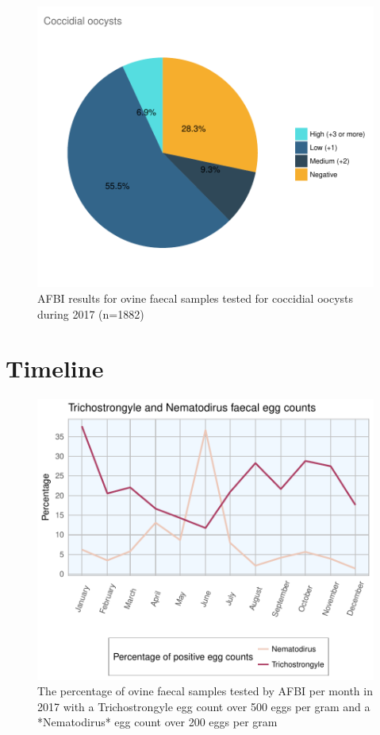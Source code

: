 \documentclass[]{book}
\begin{document}
\begin{figure}

{\centering \includegraphics{AFBI_files/figure-latex/unnamed-chunk-121-1} 

}

\caption{AFBI results for ovine faecal samples tested for coccidial oocysts during 2017 (n=1882)}\label{fig:unnamed-chunk-121}
\end{figure}

\section{Timeline}\label{timeline}

\begin{figure}

{\centering \includegraphics{AFBI_files/figure-latex/unnamed-chunk-127-1} 

}

\caption{The percentage  of ovine faecal samples tested by AFBI per month in 2017 with a Trichostrongyle egg count over 500 eggs per gram and a *Nematodirus* egg count over 200 eggs per gram}\label{fig:unnamed-chunk-127}
\end{figure}


\end{document}
